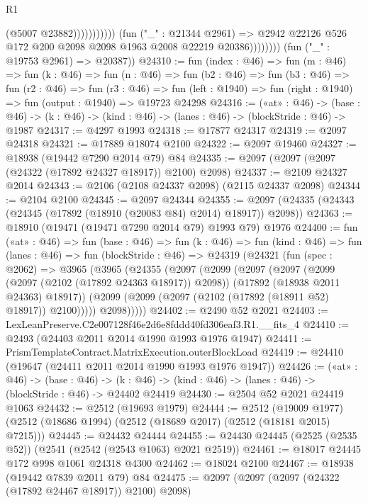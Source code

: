 \begin{lexlean}{R1}
\begin{coremodule}
                                        (@5007 @23882)))))))))))
                    (fun ("_" : @21344 @2961) =>
                    @2942 @22126 @526 @172 @200 @2098 @2098 @1963 @2008 @22219 @20386))))))))
      (fun ("_" : @19753 @2961) => @20387))
@24310 := fun (index : @46) =>
  fun (m : @46) =>
  fun (k : @46) =>
  fun (n : @46) =>
  fun (b2 : @46) =>
  fun (b3 : @46) =>
  fun (r2 : @46) =>
  fun (r3 : @46) =>
  fun (left : @1940) => fun (right : @1940) => fun (output : @1940) => @19723 @24298
@24316 := («at» : @46) ->
  (base : @46) -> (k : @46) -> (kind : @46) -> (lanes : @46) -> (blockStride : @46) -> @1987
@24317 := @4297 @1993
@24318 := @17877 @24317
@24319 := @2097 @24318
@24321 := @17889 @18074 @2100
@24322 := @2097 @19460
@24327 := @18938 (@19442 @7290 @2014 @79) @84
@24335 := @2097 (@2097 (@2097 (@24322 (@17892 @24327 @18917)) @2100) @2098)
@24337 := @2109 @24327 @2014
@24343 := @2106 (@2108 @24337 @2098) (@2115 @24337 @2098)
@24344 := @2104 @2100
@24345 := @2097 @24344
@24355 := @2097 (@24335 (@24343 (@24345 (@17892 (@18910 (@20083 @84) @2014) @18917)) @2098))
@24363 := @18910 (@19471 (@19471 @7290 @2014 @79) @1993 @79) @1976
@24400 := fun («at» : @46) =>
  fun (base : @46) =>
  fun (k : @46) =>
  fun (kind : @46) =>
  fun (lanes : @46) =>
  fun (blockStride : @46) =>
  @24319
    (@24321
      (fun (spec : @2062) =>
      @3965
        (@3965
          (@24355
            (@2097
              (@2099
                (@2097
                  (@2097
                    (@2099 (@2097 (@2102 (@17892 @24363 @18917)) @2098))
                    (@17892 (@18938 @2011 @24363) @18917))
                  (@2099 (@2099 (@2097 (@2102 (@17892 (@18911 @52) @18917)) @2100)))))
              @2098)))))
@24402 := @2490 @52 @2021
@24403 := LexLeanPreserve.C2e007128f46e2d6e8fddd40fd306eaf3.R1.__fits_4
@24410 := @2493 (@24403 @2011 @2014 @1990 @1993 @1976 @1947)
@24411 := PrismTemplateContract.MatrixExecution.outerBlockLoad
@24419 := @24410 (@19647 (@24411 @2011 @2014 @1990 @1993 @1976 @1947))
@24426 := («at» : @46) ->
  (base : @46) -> (k : @46) -> (kind : @46) -> (lanes : @46) -> (blockStride : @46) -> @24402 @24419
@24430 := @2504 @52 @2021 @24419 @1063
@24432 := @2512 (@19693 @1979)
@24444 := @2512
    (@19009 @1977)
    (@2512 (@18686 @1994) (@2512 (@18689 @2017) (@2512 (@18181 @2015) @7215)))
@24445 := @24432 @24444
@24455 := @24430 @24445 (@2525 (@2535 @52)) (@2541 (@2542 (@2543 @1063) @2021 @2519))
@24461 := @18017 @24445 @172 @998 @1061 @24318 @4300
@24462 := @18024 @2100
@24467 := @18938 (@19442 @7839 @2011 @79) @84
@24475 := @2097 (@2097 (@2097 (@24322 (@17892 @24467 @18917)) @2100) @2098)

\end{coremodule}
\end{lexlean}
